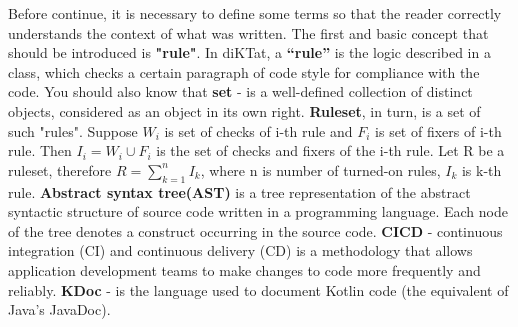 Before continue, it is necessary to define some terms so that the reader correctly understands the context of what was written. 
The first and basic concept that should be introduced is \textbf{"rule"}. In diKTat, a \textbf{“rule”} is the logic described in a class, which checks a certain paragraph of code style for compliance with the code.
 You should also know that \textbf{set} -  is a well-defined collection of distinct objects, considered as an object in its own right. 
 \textbf{Ruleset}, in turn, is a set of such "rules". Suppose $W_i$ is set of checks of i-th rule and $F_i$ is set of fixers of i-th rule. Then $I_i = W_i \cup F_i $ is the set of checks and fixers of the i-th rule. Let R be a ruleset, therefore $R = \sum_{k=1}^n I_k$, where n is number of turned-on rules, $I_k$ is k-th rule.
 \textbf{Abstract syntax tree(AST)} is a tree representation of the abstract syntactic structure of source code written in a programming language. Each node of the tree denotes a construct occurring in the source code.
 \textbf{CICD} - continuous integration (CI) and continuous delivery (CD) is a methodology that allows application development teams to make changes to code more frequently and reliably.
 \textbf{KDoc} - is the language used to document Kotlin code (the equivalent of Java's JavaDoc).